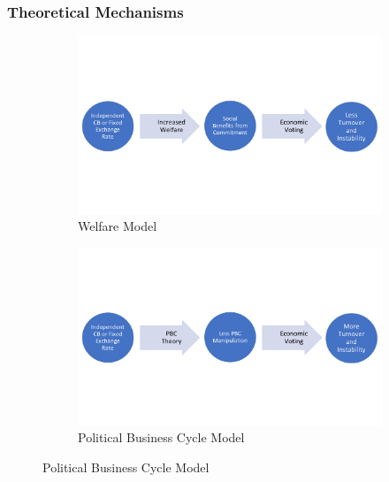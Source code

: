 \documentclass{beamer}
\begin{document}
    \begin{frame}
        \frametitle{Theoretical Mechanisms}
        \begin{figure}[h!]
            \centering
            \caption{Effects of Limiting Institutions on Instability}
                \begin{subfigure}{.5\textwidth}
                    \centering
                    \includegraphics[width=\linewidth,keepaspectratio=true]{../../Output/Figures/Social_Welfare_Model.png}
                    \caption{Welfare Model}
                \end{subfigure}%
                \begin{subfigure}{.5\textwidth}
                    \centering
                    \includegraphics[width=\linewidth,keepaspectratio=true]{../../Output/Figures/Political_Business_Cycle_Model.png}
                    \caption{Political Business Cycle Model}
                \end{subfigure}
        \end{figure}
    \end{frame}
\end{document}
